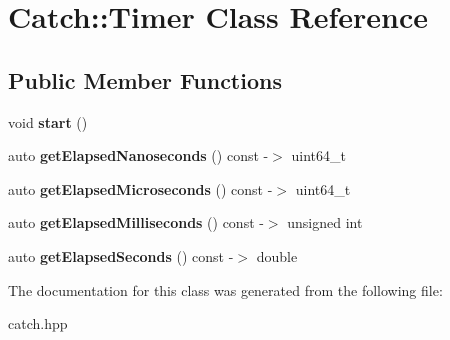 \hypertarget{classCatch_1_1Timer}{}\section{Catch\+:\+:Timer Class Reference}
\label{classCatch_1_1Timer}
\subsection*{Public Member Functions}
\begin{DoxyCompactItemize}
\item 
void {\bfseries start} ()\hypertarget{classCatch_1_1Timer_a0a56e879e43f36c102bf9ea8b5fc8b72}{}\label{classCatch_1_1Timer_a0a56e879e43f36c102bf9ea8b5fc8b72}

\item 
auto {\bfseries get\+Elapsed\+Nanoseconds} () const -\/$>$ uint64\+\_\+t\hypertarget{classCatch_1_1Timer_a57be5d17ca868a2d6fb1eea84de665cf}{}\label{classCatch_1_1Timer_a57be5d17ca868a2d6fb1eea84de665cf}

\item 
auto {\bfseries get\+Elapsed\+Microseconds} () const -\/$>$ uint64\+\_\+t\hypertarget{classCatch_1_1Timer_a545de17a61a6fee1dbe3de5b0723e5fa}{}\label{classCatch_1_1Timer_a545de17a61a6fee1dbe3de5b0723e5fa}

\item 
auto {\bfseries get\+Elapsed\+Milliseconds} () const -\/$>$ unsigned int\hypertarget{classCatch_1_1Timer_a30aaf458dbb59dd8ac8971c9c62e0eac}{}\label{classCatch_1_1Timer_a30aaf458dbb59dd8ac8971c9c62e0eac}

\item 
auto {\bfseries get\+Elapsed\+Seconds} () const -\/$>$ double\hypertarget{classCatch_1_1Timer_a065e37e3c9eb16bd4dcf41971d8deedc}{}\label{classCatch_1_1Timer_a065e37e3c9eb16bd4dcf41971d8deedc}

\end{DoxyCompactItemize}


The documentation for this class was generated from the following file\+:\begin{DoxyCompactItemize}
\item 
catch.\+hpp\end{DoxyCompactItemize}
